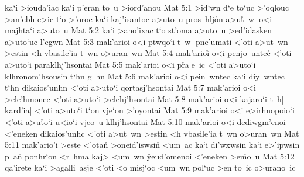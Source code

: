 ka`i
>iouda'iac
ka`i
p'eran
to~u
>iord'anou\bibvsend
\vs Mat 5:1
>id`wn
d`e
to`uc
>'oqlouc
>an'ebh
e>ic
t`o
>'oroc
ka`i
kaj'isantoc
a>uto~u
pros~hlj\r{o}n
a>u\r{t}~w|
o<i
majhta`i
a>uto~u\bibvsend
\vs Mat 5:2
ka`i
>ano'ixac
t`o
st'oma
a>uto~u
>ed'idasken
a>uto`uc
l'egwn\bibvsend
\vs Mat 5:3
mak'arioi
o<i
ptwqo`i
t~w|
pne'umati
<'oti
a>ut~wn
>estin
<h
vbasile'ia
t~wn
o>uran~wn\bibvsend
\vs Mat 5:4
mak'arioi\r{}
o<i
penjo~unte\r{c}
<'oti
a>uto`i
paraklhj'hsontai\bibvsend
\vs Mat 5:5
mak'arioi
o<i
p\r{r}a|e~ic
<'oti
a>uto`i
klhronom'hsousin
t`hn
g~hn\bibvsend
\vs Mat 5:6
mak'arioi
o<i
pein~wntec
ka`i
diy~wntec
t`hn
dikaios'unhn
<'oti
a>uto`i
qortasj'hsontai\bibvsend
\vs Mat 5:7
mak'arioi
o<i
>ele'hmonec
<'oti
a>uto`i
>elehj'hsontai\bibvsend
\vs Mat 5:8
mak'arioi
o<i
kajaro`i
t~h|
kard'ia|
<'oti
a>uto`i
t`on
vje`on
>'oyontai\bibvsend
\vs Mat 5:9
mak'arioi
o<i
e>irhnopoio`i
<'oti
a>u\r{t}o`i
u<io`i
vjeo~u
klhj'hsontai\bibvsend
\vs Mat 5:10
mak'arioi
o<i
dediwgm'enoi
<'eneken
dikaios'unhc
<'oti
a>ut~wn
>estin
<h
vbasile'ia
t~wn
o>uran~wn\bibvsend
\vs Mat 5:11
mak'ario'i
>este
<'ota\r{n}
>oneid'iswsin\r{}
<um~ac
ka`i
di'wxwsin
ka`i
e>'ipwsin
p~an\r{}
ponhr`on
<r~hma
kaj>
<um~wn
\r{y}eud'omenoi
<'eneken
>e\r{m}o~u\bibvsend
{}
\vs Mat 5:12
qa'irete
ka`i
>agalli~asje
<'oti
<o
misj`oc
<um~wn
pol`uc
>en
to~ic
o>urano~ic
